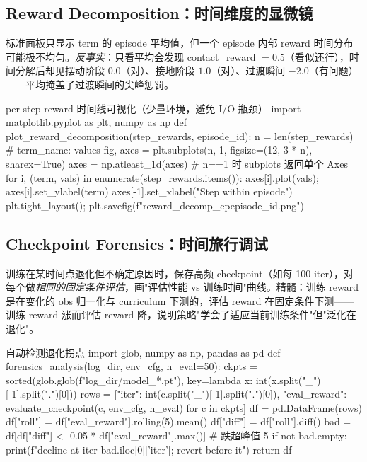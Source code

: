 \subsection{Reward Decomposition：时间维度的显微镜}

标准面板只显示 term 的 episode 平均值，但一个 episode 内部 reward 时间分布可能极不均匀。\emph{反事实}：只看平均会发现 contact\_reward $=0.5$（看似还行），时间分解后却见摆动阶段 $0.0$（对）、接地阶段 $1.0$（对）、过渡瞬间 $-2.0$（有问题）——平均掩盖了过渡瞬间的尖峰惩罚。

\begin{codebox}[Python]{per-step reward 时间线可视化（少量环境，避免 I/O 瓶颈）}
import matplotlib.pyplot as plt, numpy as np
def plot_reward_decomposition(step_rewards, episode_id):
    n = len(step_rewards)  # {term_name: values}
    fig, axes = plt.subplots(n, 1, figsize=(12, 3 * n), sharex=True)
    axes = np.atleast_1d(axes)  # n==1 时 subplots 返回单个 Axes
    for i, (term, vals) in enumerate(step_rewards.items()):
        axes[i].plot(vals); axes[i].set_ylabel(term)
    axes[-1].set_xlabel("Step within episode")
    plt.tight_layout(); plt.savefig(f"reward_decomp_ep{episode_id}.png")
\end{codebox}

\subsection{Checkpoint Forensics：时间旅行调试}

训练在某时间点退化但不确定原因时，保存高频 checkpoint（如每 100 iter），对每个做\emph{相同的固定条件评估}，画"评估性能 vs 训练时间"曲线。精髓：训练 reward 是在变化的 obs 归一化与 curriculum 下测的，评估 reward 在固定条件下测——训练 reward 涨而评估 reward 降，说明策略"学会了适应当前训练条件"但"泛化在退化"。

\begin{codebox}[Python]{自动检测退化拐点}
import glob, numpy as np, pandas as pd
def forensics_analysis(log_dir, env_cfg, n_eval=50):
    ckpts = sorted(glob.glob(f"{log_dir}/model_*.pt"),
                   key=lambda x: int(x.split("_")[-1].split(".")[0]))
    rows = [{"iter": int(c.split("_")[-1].split(".")[0]),
             "eval_reward": evaluate_checkpoint(c, env_cfg, n_eval)} for c in ckpts]
    df = pd.DataFrame(rows)
    df["roll"] = df["eval_reward"].rolling(5).mean()
    df["diff"] = df["roll"].diff()
    bad = df[df["diff"] < -0.05 * df["eval_reward"].max()]   # 跌超峰值 5%
    if not bad.empty:
        print(f"decline at iter {bad.iloc[0]['iter']}; revert before it")
    return df
\end{codebox}

